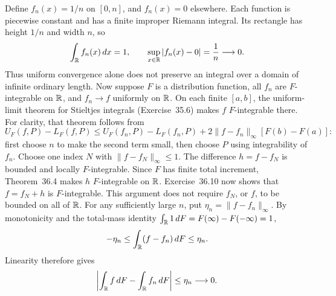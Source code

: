 Define $f_n(x)=1/n$ on $[0,n]$, and $f_n(x)=0$ elsewhere.
Each function is piecewise constant and has a finite improper
Riemann integral. Its rectangle has height $1/n$ and width $n$, so
\[
 \int_{\mathbb{R}} f_n(x)\,dx=1,\qquad
 \sup_{x\in\mathbb{R}}|f_n(x)-0|=\frac1n\longrightarrow0.
\]
Thus uniform convergence alone does not preserve an integral over
a domain of infinite ordinary length.
Now suppose $F$ is a distribution function, all $f_n$ are
$F$-integrable on $\mathbb{R}$, and $f_n\to f$ uniformly on $\mathbb{R}$.
On each finite $[a,b]$, the uniform-limit theorem for Stieltjes
integrals (Exercise~35.6) makes $f$ $F$-integrable there.
For clarity, that theorem follows from
\[
 U_F(f,P)-L_F(f,P)
 \leq U_F(f_n,P)-L_F(f_n,P)
       +2\|f-f_n\|_\infty [F(b)-F(a)]:
\]
first choose $n$ to make the second term small, then choose $P$
using integrability of $f_n$.
Choose one index $N$ with $\|f-f_N\|_\infty\leq1$. The difference
$h=f-f_N$ is bounded and locally $F$-integrable. Since $F$ has
finite total increment, Theorem~36.4 makes $h$ $F$-integrable
on $\mathbb{R}$. Exercise~36.10 now shows that $f=f_N+h$ is
$F$-integrable. This argument does not require $f_N$, or $f$,
to be bounded on all of $\mathbb{R}$.
For any sufficiently large $n$, put
$\eta_n=\|f-f_n\|_\infty$. By monotonicity and the total-mass
identity $\int_{\mathbb{R}}1\,dF=F(\infty)-F(-\infty)=1$,
\[
 -\eta_n\leq\int_{\mathbb{R}}(f-f_n)\,dF\leq\eta_n.
\]
Linearity therefore gives
\[
 \left|\int_{\mathbb{R}} f\,dF-\int_{\mathbb{R}} f_n\,dF\right|
 \leq\eta_n\longrightarrow0.
\]
